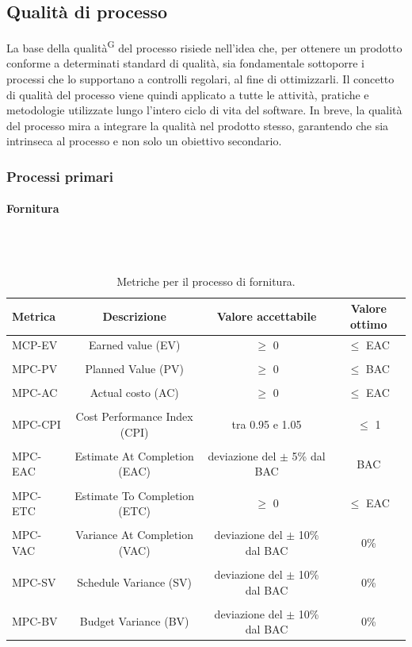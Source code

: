 \documentclass[8pt]{article}
\newcommand{\glossterm}[1]{#1\textsuperscript{G}} %
\newcommand{\subsubsubsection}[1]{\paragraph{#1}\mbox{}\\\\}
\begin{document}
\subsection{Qualità di processo}
La base della \glossterm{qualità} del processo risiede nell'idea che, per ottenere un prodotto conforme a determinati standard di qualità, sia fondamentale sottoporre i processi che lo supportano a controlli regolari, al fine di ottimizzarli. Il concetto di qualità del processo viene quindi applicato a tutte le attività, pratiche e metodologie utilizzate lungo l'intero ciclo di vita del software. In breve, la qualità del processo mira a integrare la qualità nel prodotto stesso, garantendo che sia intrinseca al processo e non solo un obiettivo secondario.
\subsubsection{Processi primari}
\subsubsubsection{Fornitura} 
\begin{table}[h]	
	\centering
	\begin{tabular}{lccc}
		\toprule
		\textbf{Metrica}& \textbf{Descrizione} & \textbf{Valore accettabile} & \textbf{Valore ottimo} \\
		\midrule
		MCP-EV & Earned value (EV) & $\geq$ 0 & $\leq$ EAC \\\\
		MPC-PV & Planned Value (PV) & $\geq$ 0 & $\leq$ BAC\\\\
		MPC-AC & Actual costo (AC) & $\geq$ 0 & $\leq$ EAC\\\\
		MPC-CPI & Cost Performance Index (CPI) & tra 0.95 e 1.05 & $\leq$ 1\\\\
		MPC-EAC & Estimate At Completion (EAC) & deviazione del $\pm$ 5\% dal BAC & BAC\\\\
		MPC-ETC & Estimate To Completion (ETC) & $\geq $ 0 & $\leq$ EAC\\\\
		MPC-VAC & Variance At Completion (VAC) & deviazione del $\pm$ 10\% dal BAC & 0\%\\\\
		MPC-SV & Schedule Variance (SV) & deviazione del $\pm$ 10\% dal BAC & 0\%\\\\
		MPC-BV & Budget Variance (BV) & deviazione del $\pm$ 10\% dal BAC  & 0\%\\
		\bottomrule
	\end{tabular}
	\caption{Metriche per il processo di fornitura.}
	\label{table:Tabella metriche per il processo di fornitura.}
\end{table}
\end{document}
